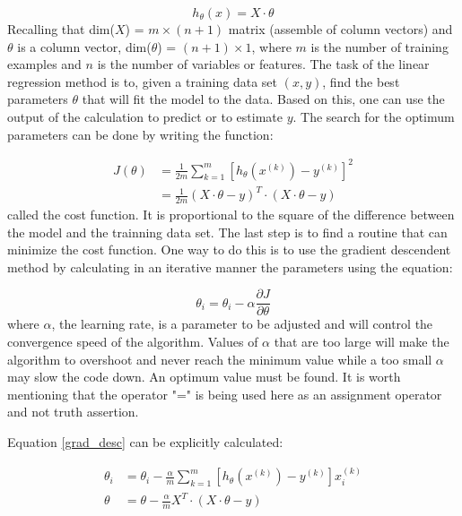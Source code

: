 \documentclass[
10pt, %
a4paper, %
oneside, %
headinclude,footinclude, %
BCOR5mm, %
]{scrartcl}
\begin{document}
\begin{equation}
    h_{\theta}(x) = X \cdot \theta
\end{equation}
Recalling that dim($X$) =  $m \times (n+1)$ matrix (assemble of column vectors) and $\theta$ is a column vector, dim($\theta$) = $(n+1) \times 1$,
where $m$ is the number of training examples and $n$ is the number of variables or features.
The task of the linear regression method is to, given a training data set $(x,y)$, find the best parameters $\theta$ that will fit the model to the data.
Based on this, one can use the output of the calculation to predict or to estimate $y$. The search for the optimum parameters can be done by writing the function:

\begin{equation}
    \begin{split}
        J(\theta) &= \frac{1}{2 m} \sum _{k=1}^{m} [ h_{\theta}(x^{(k)}) - y^{(k)}]^{2} \\
                    & = \frac{1}{2 m} (X \cdot \theta - y)^{T} \cdot (X \cdot \theta - y)
    \end{split}
\end{equation}
called the cost function. It is proportional to the square of the difference between the model and the trainning data set. 
The last step is to find a routine that can minimize the cost function. One way to do this is to use the gradient descendent 
method by calculating in an iterative manner the parameters using the equation:

\begin{equation} \label{grad_desc}
    \theta_{i} = \theta_{i} - \alpha \frac{\partial J}{\partial \theta}
\end{equation}
where $\alpha$, the learning rate, is a parameter to be adjusted and will control the convergence speed of the algorithm. 
Values of $\alpha$ that are too large will make the algorithm to overshoot and never reach the minimum
value while a too small $\alpha$ may slow the code down. An optimum value must be found. It is worth mentioning that the operator "="
is being used here as an assignment operator and not truth assertion.

Equation \ref{grad_desc} can be explicitly calculated:

\begin{equation}
    \begin{split}
        \theta_{i} & = \theta_{i} - \frac{\alpha}{m} \sum _{k=1}^{m} [ h_{\theta}(x^{(k)}) - y^{(k)}] x_{i}^{(k)} \\
                   \theta & = \theta - \frac{\alpha}{m} X^{T} \cdot (X \cdot \theta - y)
    \end{split}
\end{equation}
\end{document}
